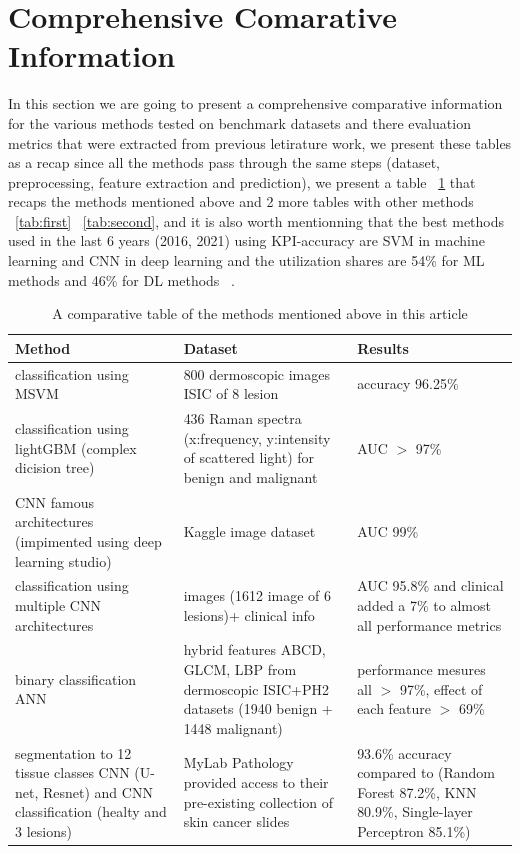 \section{Comprehensive Comarative Information}
In this section we are going to present a comprehensive comparative information for the various methods tested on benchmark datasets and there evaluation metrics that were extracted from previous letirature work, we present these tables as a recap since all the methods pass through the same steps (dataset, preprocessing, feature extraction and prediction), we present a table ~\ref{tab:outable} that recaps the methods  mentioned above and 2 more tables with other methods ~\ref{tab:first} ~\ref{tab:second}, and it is also worth mentionning that the best methods used in the last 6 years (2016, 2021) using KPI-accuracy are SVM in machine learning and CNN in deep learning and the utilization shares are 54\% for ML methods and 46\% for DL methods ~\cite{Painuli2022}.


\begin{table}[htbp]
    \begin{center}
        \begin{tabular}{p{3cm}|p{3cm}|p{6cm}}
        \hline 
        Method & Dataset & Results  \\ 
        \hline 
        classification using MSVM & 800 dermoscopic images ISIC of 8 lesion &  accuracy 96.25\% \\ 
        \hline 
        classification using lightGBM (complex dicision tree) & 436 Raman spectra (x:frequency, y:intensity of scattered light) for benign and malignant & AUC $>$ 97\%  \\ 
        \hline 
        CNN famous architectures (impimented using deep learning studio) & Kaggle image dataset &   AUC 99\% \\ 
        \hline 
        classification using multiple CNN architectures & images (1612 image of 6 lesions)+ clinical info &  AUC 95.8\% and clinical added a 7\% to almost all performance metrics \\ 
        \hline 
        binary classification ANN & hybrid features ABCD, GLCM, LBP from dermoscopic  ISIC+PH2 datasets (1940 benign + 1448 malignant) & performance mesures all $>$ 97\%, effect of each feature $>$ 69\%  \\ 
        \hline 
        segmentation to 12 tissue classes CNN (U-net, Resnet) and CNN classification (healty and 3 lesions) & MyLab Pathology provided access to their pre-existing collection of skin cancer slides & 93.6\% accuracy compared to (Random Forest 87.2\%, KNN 80.9\%, Single-layer Perceptron 85.1\%) \\ 
        \hline 
        \end{tabular} 
    \end{center}
\caption{A comparative table of the methods mentioned above in this article}
\label{tab:outable}
\end{table}

